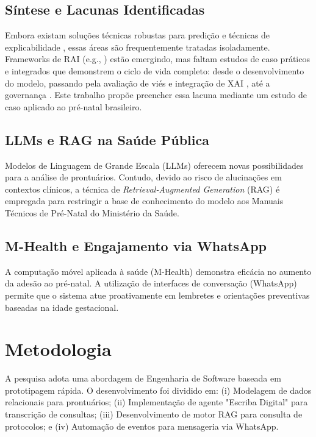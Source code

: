 \documentclass[12pt]{article}
\begin{document}
\subsection{Síntese e Lacunas Identificadas}
Embora existam soluções técnicas robustas para predição \cite{MachineLearning2022, Cetin2020} e técnicas de explicabilidade \cite{Advancing2025}, essas áreas são frequentemente tratadas isoladamente. Frameworks de RAI (e.g., \cite{Lekadir2022}) estão emergindo, mas faltam estudos de caso práticos e integrados que demonstrem o ciclo de vida completo: desde o desenvolvimento do modelo, passando pela avaliação de viés \cite{FairnessAI2023} e integração de XAI \cite{ExplainableAI2023}, até a governança \cite{AIGovernance2025}. Este trabalho propõe preencher essa lacuna mediante um estudo de caso aplicado ao pré-natal brasileiro.

\subsection{LLMs e RAG na Saúde Pública}
Modelos de Linguagem de Grande Escala (LLMs) oferecem novas possibilidades para a análise de prontuários. Contudo, devido ao risco de alucinações em contextos clínicos, a técnica de \textit{Retrieval-Augmented Generation} (RAG) é empregada para restringir a base de conhecimento do modelo aos Manuais Técnicos de Pré-Natal do Ministério da Saúde.

\subsection{M-Health e Engajamento via WhatsApp}
A computação móvel aplicada à saúde (M-Health) demonstra eficácia no aumento da adesão ao pré-natal. A utilização de interfaces de conversação (WhatsApp) permite que o sistema atue proativamente em lembretes e orientações preventivas baseadas na idade gestacional.

\section{Metodologia}

A pesquisa adota uma abordagem de Engenharia de Software baseada em prototipagem rápida. O desenvolvimento foi dividido em: (i) Modelagem de dados relacionais para prontuários; (ii) Implementação de agente "Escriba Digital" para transcrição de consultas; (iii) Desenvolvimento de motor RAG para consulta de protocolos; e (iv) Automação de eventos para mensageria via WhatsApp.
\end{document}
